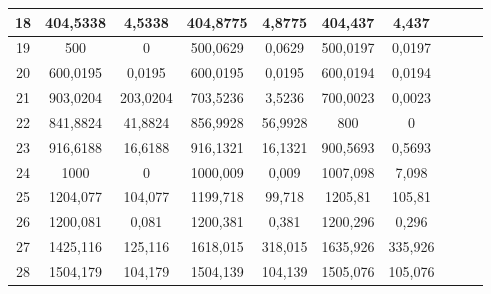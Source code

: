 \documentclass[a4paper,12pt]{article}
\theoremstyle{definition}
\begin{document}
\begin{table}[H]
\begin{tabular}{|c|c|c|c|c|c|c|c|c|c|}
    18    & 404,5338 & 4,5338 & 404,8775 & 4,8775 & 404,437 & 4,437 \\\hline
    19    & 500   & 0     & 500,0629 & 0,0629 & 500,0197 & 0,0197 \\\hline
    20    & 600,0195 & 0,0195 & 600,0195 & 0,0195 & 600,0194 & 0,0194 \\\hline
    21    & 903,0204 & 203,0204 & 703,5236 & 3,5236 & 700,0023 & 0,0023 \\\hline
    22    & 841,8824 & 41,8824 & 856,9928 & 56,9928 & 800   & 0 \\\hline
    23    & 916,6188 & 16,6188 & 916,1321 & 16,1321 & 900,5693 & 0,5693 \\\hline
    24    & 1000  & 0     & 1000,009 & 0,009 & 1007,098 & 7,098 \\\hline
    25    & 1204,077 & 104,077 & 1199,718 & 99,718 & 1205,81 & 105,81 \\\hline
    26    & 1200,081 & 0,081 & 1200,381 & 0,381 & 1200,296 & 0,296 \\\hline
    27    & 1425,116 & 125,116 & 1618,015 & 318,015 & 1635,926 & 335,926 \\\hline
    28    & 1504,179 & 104,179 & 1504,139 & 104,139 & 1505,076 & 105,076 \\\hline
\end{tabular}	
\end{table}
\end{document}
